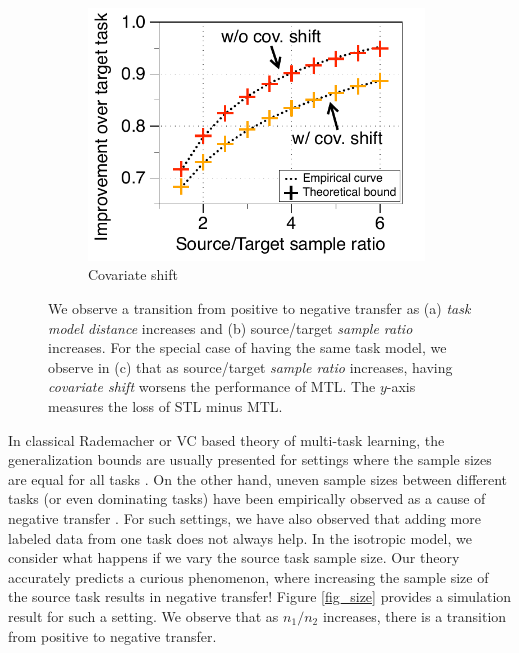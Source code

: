 \begin{figure}[!t]
\begin{subfigure}[b]{0.32\textwidth}
		\includegraphics[width=0.98\textwidth]{figures/complementary.pdf}
		\caption{Covariate shift}
		\label{fig_covariate}
	\end{subfigure}
	\caption{%
	We observe a transition from positive to negative transfer as (a) \textit{task model distance} increases and (b) source/target \textit{sample ratio} increases.
	For the special case of having the same task model, we observe in (c) that as source/target \textit{sample ratio} increases, having \textit{covariate shift} worsens the performance of MTL.
	The $y$-axis measures the loss of STL minus MTL.}
	\label{fig_model_shift_phasetrans}
\end{figure}


In classical Rademacher or VC based theory of multi-task learning, the generalization bounds are usually presented for settings where the sample sizes are equal for all tasks \cite{B00,M06,MPR16}.
On the other hand, uneven sample sizes between different tasks (or even dominating tasks) have been empirically observed as a cause of negative transfer \cite{YKGLHF20}.
For such settings, we have also observed that adding more labeled data from one task does not always help.
In the isotropic model, we consider what happens if we vary the source task sample size.
Our theory accurately predicts a curious phenomenon, where increasing the sample size of the source task results in negative transfer!
Figure \ref{fig_size} provides a simulation result for such a setting.
We observe that as $n_1 / n_2$ increases, there is a transition from positive to negative transfer.

